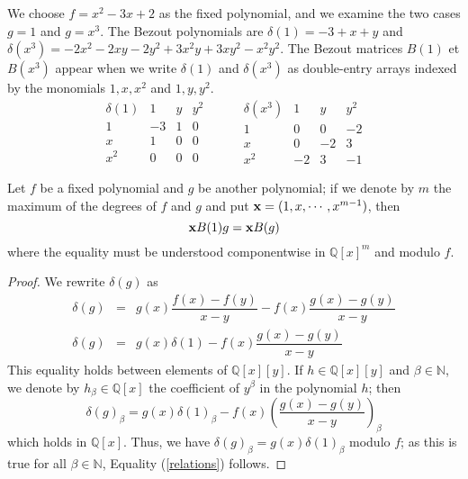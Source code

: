 \documentclass{standalone}
\begin{document}
\begin{exmp}
\label{exmp_1}
We choose $f = x^2 - 3x + 2$ as the fixed polynomial, and we examine the two cases $g=1$ and $g = x^3$. 
The Bezout polynomials are $\delta(1) = -3 + x + y$ and $\delta(x^3) = -2x^2 - 2xy -2y^2 + 3x^2y + 3xy^2 -x^2y^2$. 
The Bezout matrices $B(1)$ et $B(x^3)$ appear when we write  $\delta(1)$ and  $\delta(x^3)$ as double-entry arrays indexed by the monomials $1, x, x^2$ and $1, y, y^2$.
$$
\begin{array}{c|ccc}
\delta(1) & 1 & y & y^2\\
\hline
1 & -3 & 1 & 0\\
x & 1 & 0 & 0\\
x^2 & 0 & 0 & 0
\end{array}
\hspace{1cm}
\begin{array}{c|ccc}
\delta(x^3) & 1 & y & y^2\\
\hline
1 & 0 & 0 & -2\\
x & 0 & -2 & 3\\
x^2 & -2 & 3 & -1
\end{array}
$$
\end{exmp}

\begin{prop}
\label{relations_prop}
Let $f$ be a fixed polynomial and $g$ be another polynomial; if we denote by $m$ the maximum of the degrees of $f$ and $g$ and put $\bold{x} = (1, x,\cdots, x^{m-1})$, then
\begin{equation}
\label{relations}
	\bold{x}B(1)g = \bold{x}B(g)
\end{equation}
where the equality must be understood componentwise in $\mathbb{Q}[x]^m$ and modulo $f$.
\end{prop}
\begin{proof}
We rewrite $\delta(g)$ as
\begin{align*}
	\delta(g) & = & g(x)\dfrac{f(x)-f(y)}{x-y} - f(x)\dfrac{g(x)-g(y)}{x-y} \\ \nonumber
	\delta(g) & = & g(x)\delta(1) - f(x)\dfrac{g(x)-g(y)}{x-y}
\end{align*}
This equality holds between elements of $\mathbb{Q}[x][y]$. 
If $h\in \mathbb{Q}[x][y]$ and $\beta\in\mathbb{N}$, we denote by $h_\beta \in \mathbb{Q}[x]$ the coefficient of $y^\beta$ in the polynomial $h$; then
$$\delta(g)_\beta = g(x)\delta(1)_\beta - f(x)\left(\dfrac{g(x)-g(y)}{x-y}\right)_\beta$$
which holds in $\mathbb{Q}[x]$. Thus, we have $\delta(g)_\beta = g(x)\delta(1)_\beta$ modulo $f$; as this is true for all $\beta\in\mathbb{N}$, Equality (\ref{relations}) follows.
\end{proof}
\end{document}
